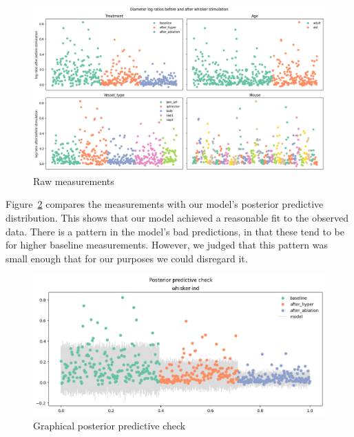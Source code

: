 \documentclass[
  letterpaper,
  DIV=11,
  numbers=noendperiod,
  oneside]{scrartcl}
\theoremstyle{plain}
\theoremstyle{remark}
\begin{document}
\begin{figure}

\begin{minipage}{\linewidth}

\includegraphics{../plots/whisker-measurements-faceted.png}

\end{minipage}%

\caption{\label{fig-whisker-measurements}Raw measurements}

\end{figure}%

Figure~\ref{fig-whisker-posterior-check} compares the measurements with
our model's posterior predictive distribution. This shows that our model
achieved a reasonable fit to the observed data. There is a pattern in
the model's bad predictions, in that these tend to be for higher
baseline measurements. However, we judged that this pattern was small
enough that for our purposes we could disregard it.

\begin{figure}

\begin{minipage}{\linewidth}

\includegraphics{../plots/whisker-posterior-check-ind.png}

\end{minipage}%

\caption{\label{fig-whisker-posterior-check}Graphical posterior
predictive check}

\end{figure}%
\end{document}

